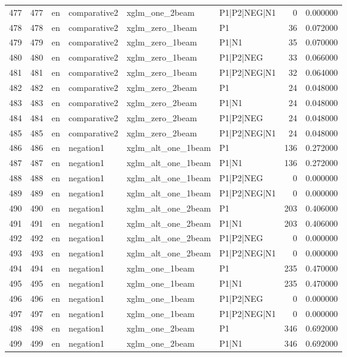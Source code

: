 \begin{tabular}{lrllllrr}
477 & 477 & en & comparative2 & xglm_one_2beam & P1|P2|NEG|N1 & 0 & 0.000000 \\
478 & 478 & en & comparative2 & xglm_zero_1beam & P1 & 36 & 0.072000 \\
479 & 479 & en & comparative2 & xglm_zero_1beam & P1|N1 & 35 & 0.070000 \\
480 & 480 & en & comparative2 & xglm_zero_1beam & P1|P2|NEG & 33 & 0.066000 \\
481 & 481 & en & comparative2 & xglm_zero_1beam & P1|P2|NEG|N1 & 32 & 0.064000 \\
482 & 482 & en & comparative2 & xglm_zero_2beam & P1 & 24 & 0.048000 \\
483 & 483 & en & comparative2 & xglm_zero_2beam & P1|N1 & 24 & 0.048000 \\
484 & 484 & en & comparative2 & xglm_zero_2beam & P1|P2|NEG & 24 & 0.048000 \\
485 & 485 & en & comparative2 & xglm_zero_2beam & P1|P2|NEG|N1 & 24 & 0.048000 \\
486 & 486 & en & negation1 & xglm_alt_one_1beam & P1 & 136 & 0.272000 \\
487 & 487 & en & negation1 & xglm_alt_one_1beam & P1|N1 & 136 & 0.272000 \\
488 & 488 & en & negation1 & xglm_alt_one_1beam & P1|P2|NEG & 0 & 0.000000 \\
489 & 489 & en & negation1 & xglm_alt_one_1beam & P1|P2|NEG|N1 & 0 & 0.000000 \\
490 & 490 & en & negation1 & xglm_alt_one_2beam & P1 & 203 & 0.406000 \\
491 & 491 & en & negation1 & xglm_alt_one_2beam & P1|N1 & 203 & 0.406000 \\
492 & 492 & en & negation1 & xglm_alt_one_2beam & P1|P2|NEG & 0 & 0.000000 \\
493 & 493 & en & negation1 & xglm_alt_one_2beam & P1|P2|NEG|N1 & 0 & 0.000000 \\
494 & 494 & en & negation1 & xglm_one_1beam & P1 & 235 & 0.470000 \\
495 & 495 & en & negation1 & xglm_one_1beam & P1|N1 & 235 & 0.470000 \\
496 & 496 & en & negation1 & xglm_one_1beam & P1|P2|NEG & 0 & 0.000000 \\
497 & 497 & en & negation1 & xglm_one_1beam & P1|P2|NEG|N1 & 0 & 0.000000 \\
498 & 498 & en & negation1 & xglm_one_2beam & P1 & 346 & 0.692000 \\
499 & 499 & en & negation1 & xglm_one_2beam & P1|N1 & 346 & 0.692000 \\

\end{tabular}
